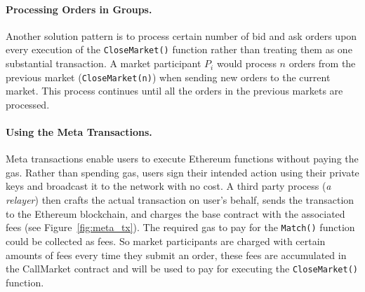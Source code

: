 \paragraph{Processing Orders in Groups.} Another solution pattern is to process certain number of bid and ask orders upon every execution of the \texttt{CloseMarket()} function rather than treating them as one substantial transaction. A market participant $P_i$ would process $n$ orders from the previous market (\texttt{CloseMarket(n)}) when sending new orders to the current market. This process continues until all the orders in the previous markets are processed. %

\paragraph{Using the Meta Transactions.} Meta transactions enable users to execute Ethereum functions without paying the gas. Rather than spending gas, users sign their intended action using their private keys and broadcast it to the network with no cost. A third party process (\textit{a relayer}) then crafts the actual transaction on user's behalf, sends the transaction to the Ethereum blockchain, and charges the base contract with the associated fees (see Figure~\ref{fig:meta_tx}). The required gas to pay for the \texttt{Match()} function could be collected as fees. So market participants are charged with certain amounts of fees every time they submit an order, these fees are accumulated in the CallMarket contract and will be used to pay for executing the \texttt{CloseMarket()} function.

% 





